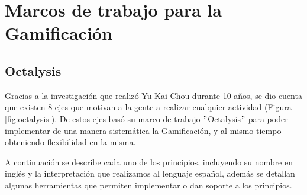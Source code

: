 \begin{comment}
        Competencias            &   &   & X & X &   &   & X &   & X &   \\\hline
        Niveles                 & X &   &   &   &   &   &   &   &   &   \\\hline
        Desbloqueo de contenido & X &   &   &   & X &   &   &   &   &   \\\hline
        Logros                  & X &   &   &   &   &   & X &   &   & X \\\hline
        Esquema financiero      &   &   &   &   &   &   &   &   &   &   \\\hline
        Cajas de botín          &   &   &   &   &   &   &   &   &   &   \\\hline
        Puntos                  & X & X &   &   &   &   &   &   & X &   \\\hline
        Tienda                  &   &   &   &   &   &   &   &   &   &   \\\hline
        Tabla lideres           & X &   &   &   &   &   & X & X &   & X \\\hline
        Barra de progreso       & X &   &   &   &   &   &   &   &   &   \\\hline
        
    }{Tabla de comparación de componentes externos (plugins) en Moodle}

\end{comment}

\section{Marcos de trabajo para la Gamificación}
\subsection{Octalysis}
\label{sec:octalysis}

    Gracias a la investigación que realizó Yu-Kai Chou durante 10 años, se dio cuenta que existen 8 ejes que motivan a la gente a realizar cualquier actividad (Figura \ref{fig:octalysis}). De estos ejes basó su marco de trabajo $"$Octalysis$"$ para poder implementar de una manera sistemática la Gamificación, y al mismo tiempo obteniendo flexibilidad en la misma.
    
    
\noindent A continuación se describe cada uno de los principios, incluyendo su nombre en inglés y la interpretación que realizamos al lenguaje español, además se detallan algunas herramientas que permiten implementar o dan soporte a los principios.
    
